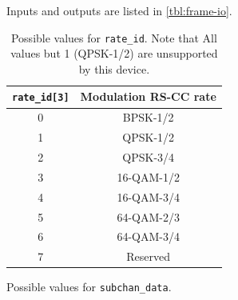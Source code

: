 \documentclass[dvips,10pt,twocolumn]{article}
\newcommand{\wire}{\texttt}
\begin{document}
Inputs and outputs are listed in \autoref{tbl:frame-io}.

\begin{table} \begin{center} \begin{tabularx}{\linewidth}{c|c}
	\label{tbl:rate-id}
	\wire{rate\_id[3]} & Modulation RS-CC rate \\ \hline
	0 & BPSK-1/2 \\
	1 & QPSK-1/2 \\
	2 & QPSK-3/4 \\
	3 & 16-QAM-1/2 \\
	4 & 16-QAM-3/4 \\
	5 & 64-QAM-2/3 \\
	6 & 64-QAM-3/4 \\
	7 & Reserved
\end{tabularx} \caption{Possible values for \wire{rate\_id}. Note that
All values but 1 (QPSK-1/2) are unsupported by this device.}
\end{center} \end{table}

\begin{table}
	\label{tbl:subchan}
	
	\caption{Possible values for \wire{subchan\_data}.}
\end{table}
\end{document}
